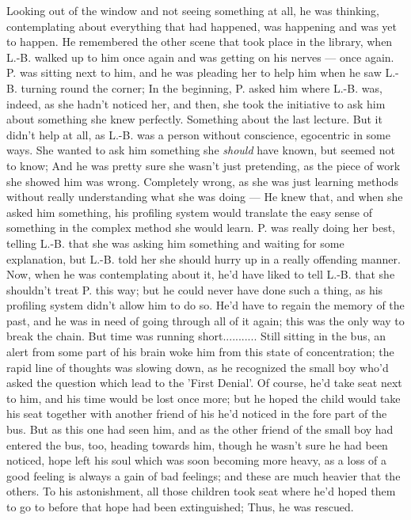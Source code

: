 Looking out of the window and not seeing something at all, he was thinking, contemplating about everything that had happened, was happening and was yet to happen. He remembered the other scene that took place in the library, when L.-B. walked up to him once again and was getting on his nerves --- once again. P. was sitting next to him, and he was pleading her to help him when he saw L.-B. turning round the corner; In the beginning, P. asked him where L.-B. was, indeed, as she hadn't noticed her, and then, she took the initiative to ask him about something she knew perfectly. Something about the last lecture. But it didn't help at all, as L.-B. was a person without conscience, egocentric in some ways. She wanted to ask him something she \emph{should} have known, but seemed not to know; And he was pretty sure she wasn't just pretending, as the piece of work she showed him was wrong. 
Completely wrong, as she was just learning methods without really understanding what she was doing --- He knew that, and when she asked him something, his profiling system would translate the easy sense of something in the complex method she would learn. 
P. was really doing her best, telling L.-B. that she was asking him something and waiting for some explanation, but L.-B. told her she should hurry up in a really offending manner. Now, when he was contemplating about it, he'd have liked to tell L.-B. that she shouldn't treat P. this way; but he could never have done such a thing, as his profiling system didn't allow him to do so. 
He'd have to regain the memory of the past, and he was in need of going through all of it again; this was the only way to break the chain. But time was running short...........
Still sitting in the bus, an alert from some part of his brain woke him from this state of concentration; the rapid line of thoughts was slowing down, as he recognized the small boy who'd asked the question which lead to the 'First Denial'. Of course, he'd take seat next to him, and his time would be lost once more; but he hoped the child would take his seat together with another friend of his he'd noticed in the fore part of the bus. But as this one had seen him, and as the other friend of the small boy had entered the bus, too, heading towards him, though he wasn't sure he had been noticed, hope left his soul which was soon becoming more heavy, as a loss of a good feeling is always a gain of bad feelings; and these are much heavier that the others. To his astonishment, all those children took seat where he'd hoped them to go to before that hope had been extinguished; Thus, he was rescued. 
